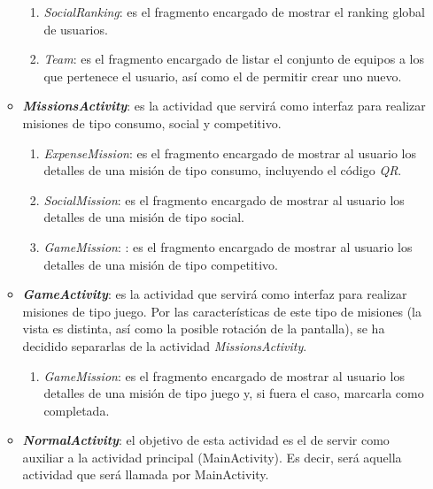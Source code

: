 \documentclass[twoside]{report}
\begin{document}
\begin{enumerate}
\begin{itemize}
\begin{enumerate}
			\item \textit{SocialRanking}: es el fragmento encargado de mostrar el ranking global de usuarios.
			
			\item \textit{Team}: es el fragmento encargado de listar el conjunto de equipos a los que pertenece el usuario, así como el de permitir crear uno nuevo.
		\end{enumerate}
		
	\item \textbf{\textit{MissionsActivity}}: es la actividad que servirá como interfaz para realizar misiones de tipo consumo, social y competitivo. 
	
		\begin{enumerate}
		\item \textit{ExpenseMission}: es el fragmento encargado de mostrar al usuario los detalles de una misión de tipo consumo, incluyendo el código \textit{QR}.
		
		\item \textit{SocialMission}: es el fragmento encargado de mostrar al usuario los detalles de una misión de tipo social.
		\item \textit{GameMission}: : es el fragmento encargado de mostrar al usuario los detalles de una misión de tipo competitivo.
		\end{enumerate}
		
	\item \textbf{\textit{GameActivity}}: es la actividad que servirá como interfaz para realizar misiones de tipo juego. Por las características de este tipo de misiones (la vista es distinta, así como la posible rotación de la pantalla), se ha decidido separarlas de la actividad \textit{MissionsActivity}.
	\begin{enumerate}
		\item \textit{GameMission}: es el fragmento encargado de mostrar al usuario los detalles de una misión de tipo juego y, si fuera el caso, marcarla como completada.
		\end{enumerate}
		
	\item \textbf{\textit{NormalActivity}}: el objetivo de esta actividad es el de servir como auxiliar a la actividad principal (MainActivity). Es decir, será aquella actividad que será llamada por MainActivity.
	

\end{itemize}
\end{enumerate}
\end{document}
